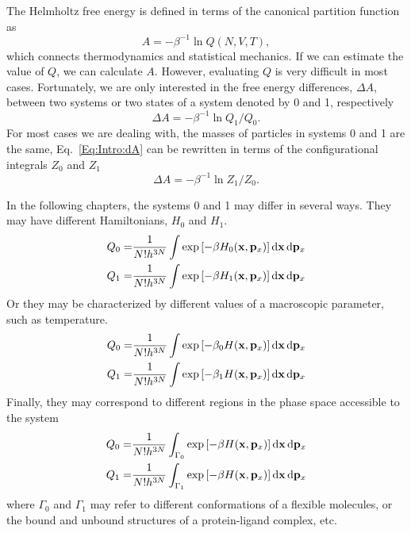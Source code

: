 The Helmholtz free energy is defined in terms of the canonical partition function as
\begin{equation}
A=-\beta^{-1}\ln{Q(N,V,T)},
\end{equation}
which connects thermodynamics and statistical mechanics. If we can estimate the value of $Q$, we can calculate $A$. However, evaluating $Q$ is very difficult in most cases. Fortunately, we are only interested in the free energy differences, $\Delta A$, between two systems or two states of a system denoted by 0 and 1, respectively
\begin{equation}
\Delta A=-\beta^{-1}\ln{Q_1/Q_0}.
\label{Eq:Intro:dA}
\end{equation}
For most cases we are dealing with, the masses of particles in systems 0 and 1 are the same, Eq.~\ref{Eq:Intro:dA} can be rewritten in terms of the configurational integrals $Z_0$ and $Z_1$
\begin{equation}
\Delta A=-\beta^{-1}\ln{Z_1/Z_0}.
\end{equation}

In the following chapters, the systems 0 and 1 may differ in several ways. They may have different Hamiltonians, $H_0$ and $H_1$. 
\begin{align}
	Q_0=&\frac{1}{N!h^{3N}}\int\exp{\left[-\beta H_0(\mathbf{x},\mathbf{p}_x)\right]}\mathop{}\!\mathrm{d} \mathbf{x}\mathop{}\!\mathrm{d} \mathbf{p}_x\\
	Q_1=&\frac{1}{N!h^{3N}}\int\exp{\left[-\beta H_1(\mathbf{x},\mathbf{p}_x)\right]}\mathop{}\!\mathrm{d} \mathbf{x}\mathop{}\!\mathrm{d} \mathbf{p}_x
\end{align}
Or they may be characterized by different values of a macroscopic parameter, such as temperature. 
\begin{align}
	Q_0=&\frac{1}{N!h^{3N}}\int\exp{\left[-\beta_0 H(\mathbf{x},\mathbf{p}_x)\right]}\mathop{}\!\mathrm{d} \mathbf{x}\mathop{}\!\mathrm{d} \mathbf{p}_x\\
	Q_1=&\frac{1}{N!h^{3N}}\int\exp{\left[-\beta_1 H(\mathbf{x},\mathbf{p}_x)\right]}\mathop{}\!\mathrm{d} \mathbf{x}\mathop{}\!\mathrm{d} \mathbf{p}_x
\end{align}
Finally, they may correspond to different regions in the phase space accessible to the system
\begin{align}
Q_0=&\frac{1}{N!h^{3N}}\int_{\Gamma_0}\exp{\left[-\beta H(\mathbf{x},\mathbf{p}_x)\right]}\mathop{}\!\mathrm{d} \mathbf{x}\mathop{}\!\mathrm{d} \mathbf{p}_x\\
Q_1=&\frac{1}{N!h^{3N}}\int_{\Gamma_1}\exp{\left[-\beta H(\mathbf{x},\mathbf{p}_x)\right]}\mathop{}\!\mathrm{d} \mathbf{x}\mathop{}\!\mathrm{d} \mathbf{p}_x
\end{align}
where $\Gamma_0$ and $\Gamma_1$ may refer to different conformations of a flexible molecules, or the bound and unbound structures of a protein-ligand complex, etc.

